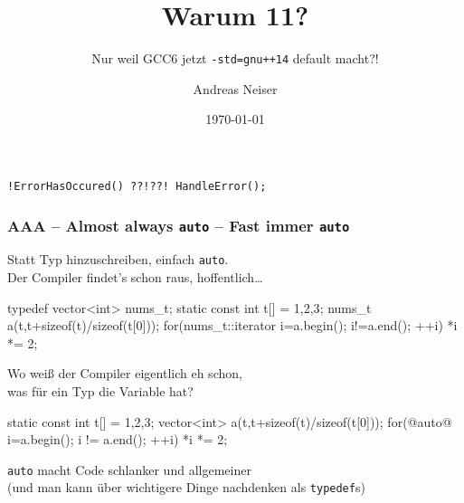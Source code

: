 \documentclass[t,ngerman,usepdftitle=false]{beamer}
\author{Andreas Neiser}
\title{Warum \Cpp{}11?}
\subtitle{Nur weil GCC6 jetzt \lstinline|-std=gnu++14| default macht?!}
\date{\today}
\begin{document}
\begin{frame}[fragile]
  
    \maketitle
  
  \begin{center}
    \lstinline|!ErrorHasOccured() ??!??! HandleError();|
  \end{center}
\end{frame}


\begin{frame}[fragile]
  \frametitle{AAA -- Almost always \lstinline!auto! -- Fast immer \lstinline!auto! }
  Statt Typ hinzuschreiben, einfach \lstinline!auto!. \\ Der Compiler findet's schon raus, hoffentlich\ldots
  
\begin{cpplisting}
typedef vector<int> nums_t; 
static const int t[] = {1,2,3};
nums_t a(t,t+sizeof(t)/sizeof(t[0])); 
for(nums_t::iterator i=a.begin();  i!=a.end(); ++i)
  *i *= 2;
\end{cpplisting}

Wo weiß der Compiler eigentlich eh schon, \\ was für ein Typ die Variable hat?

\pause 
\begin{cpplisting}
static const int t[] = {1,2,3};
vector<int> a(t,t+sizeof(t)/sizeof(t[0])); 
for(@auto@ i=a.begin();  i != a.end(); ++i)
  *i *= 2;
\end{cpplisting}

\pause 
\begin{block}{}
  \centering
  \lstinline!auto! macht Code schlanker und allgemeiner\\ \small (und man kann über wichtigere Dinge nachdenken als \lstinline|typedef|s) 
\end{block}
  
\end{frame}
\end{document}
